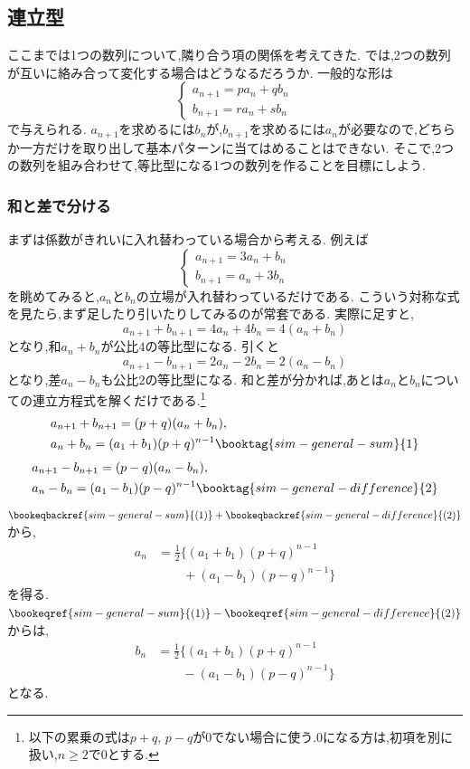 
\subsection{連立型}\label{節：連立型}
ここまでは1つの数列について,隣り合う項の関係を考えてきた.
では,2つの数列が互いに絡み合って変化する場合はどうなるだろうか.
一般的な形は
\[
  \begin{cases}
    a_{n+1}=pa_n+qb_n\\
    b_{n+1}=ra_n+sb_n
  \end{cases}
\]
で与えられる.
$a_{n+1}$を求めるには$b_n$が,$b_{n+1}$を求めるには$a_n$が必要なので,どちらか一方だけを取り出して基本パターンに当てはめることはできない.
そこで,2つの数列を組み合わせて,等比型になる1つの数列を作ることを目標にしよう.

\subsubsection{和と差で分ける}
まずは係数がきれいに入れ替わっている場合から考える.
例えば
\[
  \begin{cases}
    a_{n+1}=3a_n+b_n\\
    b_{n+1}=a_n+3b_n
  \end{cases}
\]
を眺めてみると,$a_n$と$b_n$の立場が入れ替わっているだけである.
こういう対称な式を見たら,まず足したり引いたりしてみるのが常套である.
実際に足すと,
\[
  a_{n+1}+b_{n+1}=4a_n+4b_n=4(a_n+b_n)
\]
となり,和$a_n+b_n$が公比$4$の等比型になる.
引くと
\[
  a_{n+1}-b_{n+1}=2a_n-2b_n=2(a_n-b_n)
\]
となり,差$a_n-b_n$も公比$2$の等比型になる.
和と差が分かれば,あとは$a_n$と$b_n$についての連立方程式を解くだけである.\footnote{以下の累乗の式は$p+q,\,p-q$が0でない場合に使う.0になる方は,初項を別に扱い,$n\ge2$で0とする.}
\begin{align*}
  &a_{n+1}+b_{n+1}=(p+q)(a_n+b_n),\\
  &a_n+b_n=(a_1+b_1)(p+q)^{n-1}
  \booktag{sim-general-sum}{1}
\end{align*}
\begin{align*}
  &a_{n+1}-b_{n+1}=(p-q)(a_n-b_n),\\
  &a_n-b_n=(a_1-b_1)(p-q)^{n-1}
  \booktag{sim-general-difference}{2}
\end{align*}
$\bookeqbackref{sim-general-sum}{(1)}+\bookeqbackref{sim-general-difference}{(2)}$から,
\[
  \begin{aligned}
    a_n&=\frac12\bigl\{(a_1+b_1)(p+q)^{n-1}\\
    &\qquad+(a_1-b_1)(p-q)^{n-1}\bigr\}
  \end{aligned}
\]
を得る.$\bookeqref{sim-general-sum}{(1)}-\bookeqref{sim-general-difference}{(2)}$からは,
\[
  \begin{aligned}
    b_n&=\frac12\bigl\{(a_1+b_1)(p+q)^{n-1}\\
    &\qquad-(a_1-b_1)(p-q)^{n-1}\bigr\}
  \end{aligned}
\]
となる.


